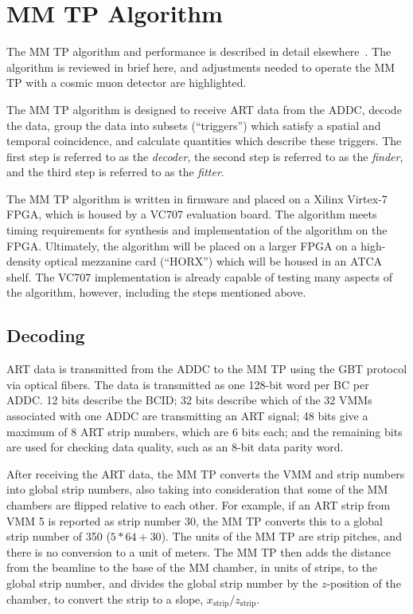 \section{MM TP Algorithm}
\label{sec:alg}

The MM TP algorithm and performance is described in detail elsewhere~\cite{brian,steve}. The algorithm is reviewed in brief here, and adjustments needed to operate the MM TP with a cosmic muon detector are highlighted.

The MM TP algorithm is designed to receive ART data from the ADDC, decode the data, group the data into subsets (``triggers'') which satisfy a spatial and temporal coincidence, and calculate quantities which describe these triggers. The first step is referred to as the \textit{decoder}, the second step is referred to as the \textit{finder}, and the third step is referred to as the \textit{fitter}.

The MM TP algorithm is written in firmware and placed on a Xilinx Virtex-7 FPGA, which is housed by a VC707 evaluation board. The algorithm meets timing requirements for synthesis and implementation of the algorithm on the FPGA. Ultimately, the algorithm will be placed on a larger FPGA on a high-density optical mezzanine card (``HORX'') which will be housed in an ATCA shelf. The VC707 implementation is already capable of testing many aspects of the algorithm, however, including the steps mentioned above.

\subsection{Decoding}
\label{sec:alg-decode}

ART data is transmitted from the ADDC to the MM TP using the GBT protocol via optical fibers. The data is transmitted as one 128-bit word per BC per ADDC. 12 bits describe the BCID; 32 bits describe which of the 32 VMMs associated with one ADDC are transmitting an ART signal; 48 bits give a maximum of 8 ART strip numbers, which are 6 bits each; and the remaining bits are used for checking data quality, such as an 8-bit data parity word.

After receiving the ART data, the MM TP converts the VMM and strip numbers into global strip numbers, also taking into consideration that some of the MM chambers are flipped relative to each other. For example, if an ART strip from VMM 5 is reported as strip number 30, the MM TP converts this to a global strip number of 350 ($5*64 + 30$). The units of the MM TP are strip pitches, and there is no conversion to a unit of meters. The MM TP then adds the distance from the beamline to the base of the MM chamber, in units of strips, to the global strip number, and divides the global strip number by the $z$-position of the chamber, to convert the strip to a slope, $x_\text{strip} / z_\text{strip}$.

